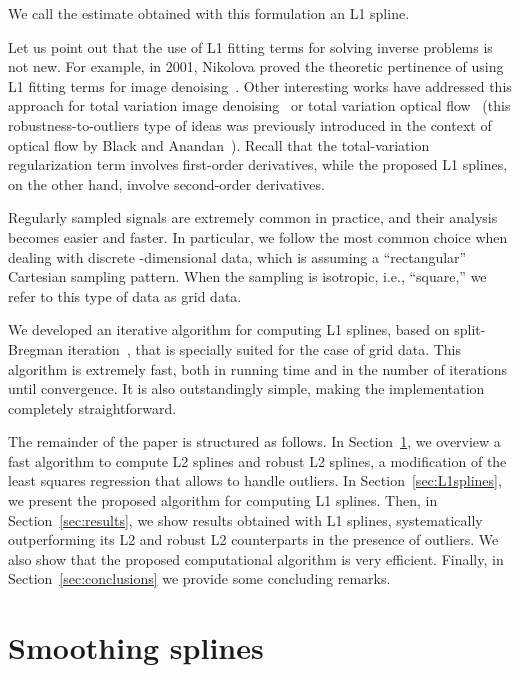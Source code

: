 \documentclass[preprint]{imsart}
\begin{document}
We call the estimate  obtained with this formulation an L1 spline.

Let us point out that the use of L1 fitting terms for solving inverse problems is not new.
For example, in 2001, Nikolova proved the theoretic pertinence of using L1 fitting terms for image denoising~\cite{nikolova02}. 
Other interesting works have addressed this approach for total variation image denoising~\cite{alliney97,chan2004,aujol06,nikolova12} or total variation optical flow~\cite{zach07,wedel09,raket11} (this robustness-to-outliers type of ideas was previously introduced in the context of optical flow by Black and Anandan~\cite{black91}). Recall that the total-variation regularization term involves first-order derivatives, while the proposed L1 splines, on the other hand, involve second-order derivatives.

Regularly sampled signals are extremely common in practice, and their analysis becomes easier and faster. In particular, we follow the most common choice when dealing with discrete -dimensional data, which is assuming a ``rectangular'' Cartesian sampling pattern. When the sampling is isotropic, i.e., ``square,'' we refer to this type of data as grid data.

We developed an iterative algorithm for computing L1 splines, based on split-Bregman iteration~\cite{goldstein09}, that is specially suited for the case of grid data. This algorithm is extremely fast, both in running time and in the number of iterations until convergence. It is also outstandingly simple, making the implementation completely straightforward.

The remainder of the paper is structured as follows. In Section~\ref{sec:L2splines}, we overview a fast algorithm to compute L2 splines and robust L2 splines, a modification of the least squares regression that allows to handle outliers. In Section~\ref{sec:L1splines}, we present the proposed algorithm for computing L1 splines. Then, in Section~\ref{sec:results}, we show results obtained with L1 splines, systematically outperforming its L2 and robust L2 counterparts in the presence of outliers. We also show that the proposed computational algorithm is very efficient. Finally, in Section~\ref{sec:conclusions} we provide some concluding remarks.

\section{Smoothing splines}
\label{sec:L2splines}
\end{document}
